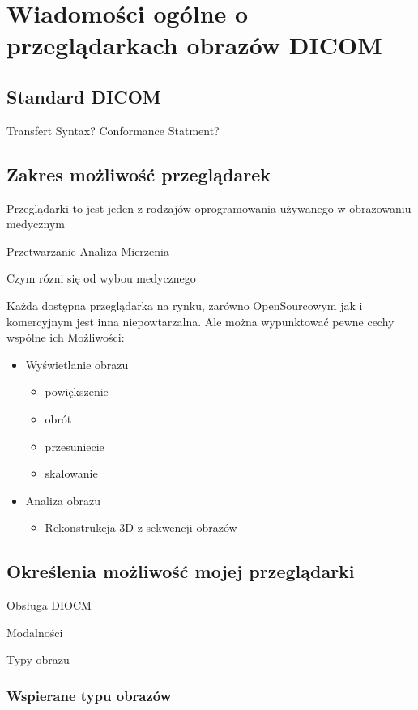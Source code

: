 \section{Wiadomości ogólne o przeglądarkach obrazów DICOM}

\subsection{Standard DICOM}

Transfert Syntax?
Conformance Statment?

\subsection{Zakres możliwość przeglądarek}

Przeglądarki to jest jeden z rodzajów oprogramowania używanego w obrazowaniu medycznym

Przetwarzanie
Analiza
Mierzenia

Czym rózni się od wybou medycznego

Każda dostępna przeglądarka na rynku, zarówno OpenSourcowym jak i komercyjnym jest inna niepowtarzalna.
Ale można wypunktować pewne cechy wspólne ich Możliwości:

\begin{itemize}
    \item Wyświetlanie obrazu
    \begin{itemize}
        \item powiększenie
        \item obrót
        \item przesuniecie
        \item skalowanie
    \end{itemize}
    \item Analiza obrazu
    \begin{itemize}
        \item Rekonstrukcja 3D z sekwencji obrazów
    \end{itemize}
\end{itemize}


\subsection{Określenia możliwość mojej przeglądarki}

Obsługa DIOCM

Modalności

Typy obrazu


\subsubsection{Wspierane typu obrazów}

